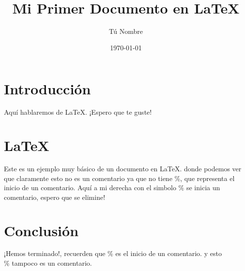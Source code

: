  
\title{Mi Primer Documento en LaTeX} 
\author{Tú Nombre} 
\date{\today} 
\maketitle 
\section{Introducción} 
Aquí hablaremos de LaTeX. ¡Espero que te guste!
\section{LaTeX}
Este es un ejemplo muy básico de un documento en \LaTeX{}.
donde podemos ver que claramente esto no es un comentario ya que no tiene \%, que representa el inicio de un comentario.
Aquí a mi derecha con el simbolo \% se inicia un comentario, espero que se elimine! 
\section{Conclusión}
¡Hemos terminado!, recuerden que \% es el inicio de un comentario. y esto \\\% tampoco es un comentario.
